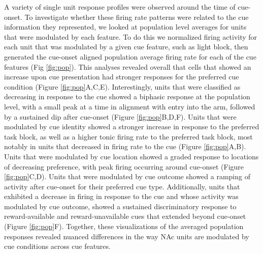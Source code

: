 \documentclass[11pt]{article}
\begin{document}
A variety of single unit response profiles were observed around the time of cue-onset. To investigate whether these firing rate patterns were related to the cue information they represented, we looked at population level averages for units that were modulated by each feature. To do this we normalized firing activity for each unit that was modulated by a given cue feature, such as light block, then generated the cue-onset aligned population average firing rate for each of the cue features (Fig \ref{fig:pop}). This analyses revealed overall that cells that showed an increase upon cue presentation had stronger responses for the preferred cue condition (Figure \ref{fig:pop}A,C,E). Interestingly, units that were classified as decreasing in response to the cue showed a biphasic response at the population level, with a small peak at a time in alignment with entry into the arm, followed by a sustained dip after cue-onset (Figure \ref{fig:pop}B,D,F). Units that were modulated by cue identity showed a stronger increase in response to the preferred task block, as well as a higher tonic firing rate to the preferred task block, most notably in units that decreased in firing rate to the cue (Figure \ref{fig:pop}A,B). Units that were modulated by cue location showed a graded response to locations of decreasing preference, with peak firing occurring around cue-onset (Figure \ref{fig:pop}C,D). Units that were modulated by cue outcome showed a ramping of activity after cue-onset for their preferred cue type. Additionally, units that exhibited a decrease in firing in response to the cue and whose activity was modulated by cue outcome, showed a sustained discriminatory response to reward-available and reward-unavailable cues that extended beyond cue-onset (Figure \ref{fig:pop}F). Together, these visualizations of the averaged population responses revealed nuanced differences in the way NAc units are modulated by cue conditions across cue features.  
\end{document}
